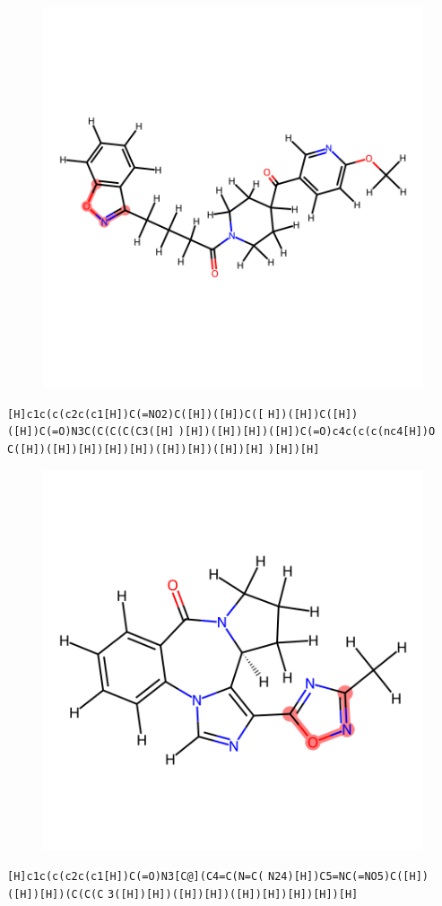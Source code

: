 \documentclass{article}
\begin{document}
\begin{figure}[ht]
\centering
    \includegraphics{mol126.png}
\end{figure}
\verb|[H]c1c(c(c2c(c1[H])C(=NO2)C([H])([H])C([| \verb|H])([H])C([H])([H])C(=O)N3C(C(C(C(C3([H]| \verb|)[H])([H])[H])([H])C(=O)c4c(c(c(nc4[H])O| \verb|C([H])([H])[H])[H])[H])([H])[H])([H])[H]| \verb|)[H])[H]|

\begin{figure}[ht]
\centering
    \includegraphics{mol127.png}
\end{figure}
\verb|[H]c1c(c(c2c(c1[H])C(=O)N3[C@](C4=C(N=C(| \verb|N24)[H])C5=NC(=NO5)C([H])([H])[H])(C(C(C| \verb|3([H])[H])([H])[H])([H])[H])[H])[H])[H]|
\end{document}
